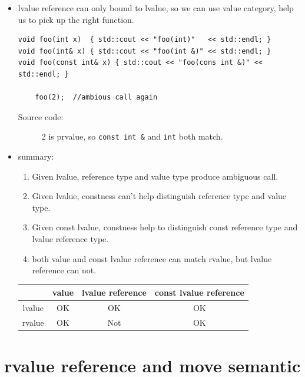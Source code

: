 \documentclass[a4paper,11pt,twoside]{book}
\begin{document}
\begin{itemize}
		\item lvalue reference can only bound to lvalue, so we can use value category, help us to pick up the right function.
\begin{lstlisting}[numbers=none]
void foo(int x)  { std::cout << "foo(int)"   << std::endl; }
void foo(int& x) { std::cout << "foo(int &)" << std::endl; }
void foo(const int& x) { std::cout << "foo(cons int &)" << std::endl; }
	
	foo(2);	 //ambious call again
\end{lstlisting}
\begin{description}
	\item[Source code:] 2 is prvalue, so \texttt{const int \&} and \texttt{int} both match.
\end{description}

\item summary:
\begin{enumerate}
	\item Given lvalue, reference type and value type produce ambiguous call.
	\item Given lvalue, constness can't help distinguish reference type and value type.
	\item Given const lvalue, constness help to distinguish const reference type and lvalue reference type.
	\item both value and const lvalue reference can match rvalue, but lvalue reference can not. 
\end{enumerate}
\begin{center}
	\begin{tabular}{|c|c|c|c|}
		\hline
		& value & lvalue reference  & const lvalue reference  \\
		\hline
		lvalue & OK &  OK & OK  \\
		\hline
		rvalue & OK & Not & OK   \\
		\hline
	\end{tabular}
\end{center}

    

\end{itemize}

\section{rvalue reference and move semantic}
\end{document}

